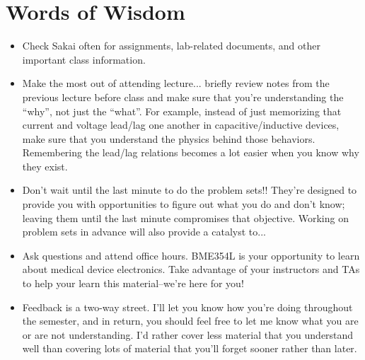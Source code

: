 \section{Words of Wisdom}
\begin{itemize}
    \item Check Sakai often for assignments, lab-related documents, and other
    important class information.
    \item Make the most out of attending lecture... briefly review notes from
    the previous lecture before class and make sure that you're understanding
    the ``why'', not just the ``what''. For example, instead of just memorizing
    that current and voltage lead/lag one another in capacitive/inductive
    devices, make sure that you understand the physics behind those behaviors.
    Remembering the lead/lag relations becomes a lot easier when you know why
    they exist.
    \item Don't wait until the last minute to do the problem sets!! They're
    designed to provide you with opportunities to figure out what you do and
    don't know; leaving them until the last minute compromises that objective.
    Working on problem sets in advance will also provide a catalyst to...
    \item Ask questions and attend office hours. BME354L is your opportunity to
    learn about medical device electronics. Take advantage of your instructors
    and TAs to help your learn this material--we're here for you!
    \item Feedback is a two-way street. I'll let you know how you’re doing
    throughout the semester, and in return, you should feel free to let me know
    what you are or are not understanding. I'd rather cover less material that
    you understand well than covering lots of material that you'll forget
    sooner rather than later.
\end{itemize}
